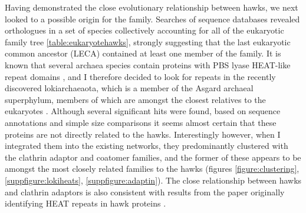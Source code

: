 \documentclass[a4paper,11pt,twoside,openright]{scrbook}
\begin{document}
Having demonstrated the close evolutionary relationship between hawks, we next looked to a possible origin for the family. Searches of sequence databases revealed orthologues in a set of species collectively accounting for all of the eukaryotic family tree \ref{table:eukaryotehawks}, strongly suggesting that the last eukaryotic common ancestor (LECA) contained at least one member of the family. It is known that several archaea species contain proteins with PBS lyase HEAT-like repeat domains \cite{Schlesner2009}, and I therefore decided to look for repeats in the recently discovered lokiarchaeaota, which is a member of the Asgard archaeal superphylum, members of which are amongst the closest relatives to the eukaryotes \cite{Spang2015,Zaremba-Niedzwiedzka2017}. Although several significant hits were found, based on sequence annotations and simple size comparisons it seems almost certain that these proteins are not directly related to the hawks. Interestingly however, when I integrated them into the existing networks, they predominantly clustered with the clathrin adaptor and coatomer families, and the former of these appears to be amongst the most closely related families to the hawks (figures \ref{figure:clustering}, \ref{suppfigure:lokiheats}, \ref{suppfigure:adaptin}). The close relationship between hawks and clathrin adaptors is also consistent with results from the paper originally identifying HEAT repeats in hawk proteins \cite{Neuwald2000}.
\end{document}
